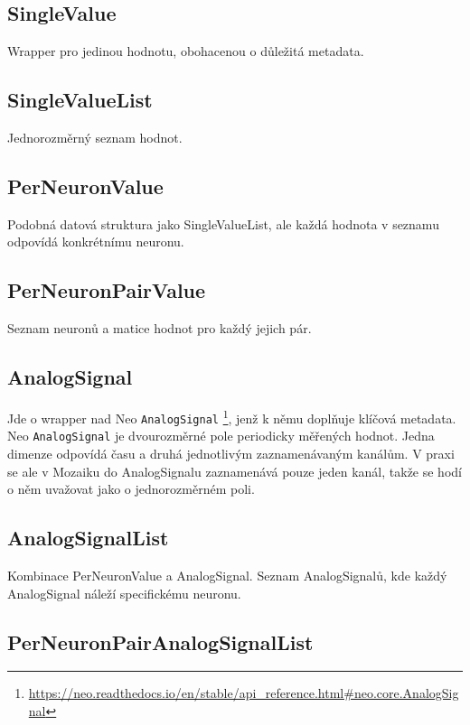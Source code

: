 \subsection{SingleValue}

Wrapper pro jedinou hodnotu, obohacenou o důležitá metadata.

\subsection{SingleValueList}

Jednorozměrný seznam hodnot.

\subsection{PerNeuronValue}

Podobná datová struktura jako SingleValueList, ale každá hodnota v seznamu odpovídá konkrétnímu neuronu.

\subsection{PerNeuronPairValue}

Seznam neuronů a matice hodnot pro každý jejich pár.

\subsection{AnalogSignal}

Jde o wrapper nad Neo \lstinline|AnalogSignal| \footnote{\url{https://neo.readthedocs.io/en/stable/api_reference.html\#neo.core.AnalogSignal}}, jenž k němu doplňuje klíčová metadata. Neo \lstinline|AnalogSignal| je dvourozměrné pole periodicky měřených hodnot. Jedna dimenze odpovídá času a druhá jednotlivým zaznamenávaným kanálům. V praxi se ale v Mozaiku do AnalogSignalu zaznamenává pouze jeden kanál, takže se hodí o něm uvažovat jako o jednorozměrném poli.

\subsection{AnalogSignalList}

Kombinace PerNeuronValue a AnalogSignal. Seznam AnalogSignalů, kde každý AnalogSignal náleží specifickému neuronu.

\subsection{PerNeuronPairAnalogSignalList}

